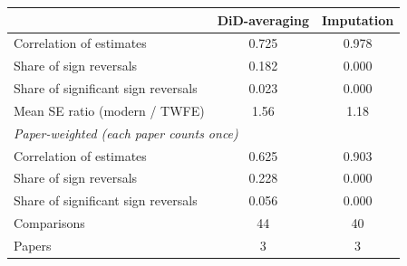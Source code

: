\begin{tabular}{lcc}
\toprule
 & DiD-averaging & Imputation \\
\midrule
Correlation of estimates & 0.725 & 0.978 \\
Share of sign reversals & 0.182 & 0.000 \\
Share of significant sign reversals & 0.023 & 0.000 \\
Mean SE ratio (modern / TWFE) & 1.56 & 1.18 \\
\midrule
\multicolumn{3}{l}{\emph{Paper-weighted (each paper counts once)}} \\
Correlation of estimates & 0.625 & 0.903 \\
Share of sign reversals & 0.228 & 0.000 \\
Share of significant sign reversals & 0.056 & 0.000 \\
\midrule
Comparisons & 44 & 40 \\
Papers & 3 & 3 \\
\bottomrule
\end{tabular}
